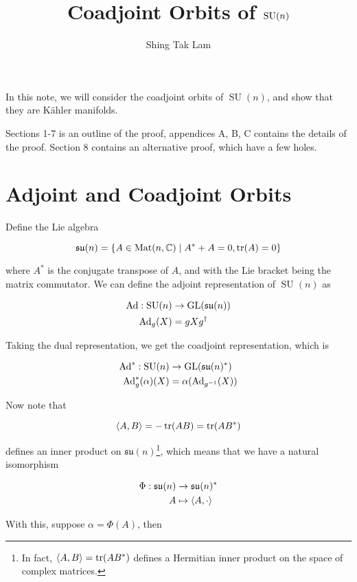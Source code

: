 \documentclass{article}
\title{Coadjoint Orbits of \(\SU(n)\)}
\author{Shing Tak Lam}
\DeclareMathOperator{\SU}{SU}
\newcommand{\su}{\mathfrak{su}}
\begin{document}
\maketitle

In this note, we will consider the coadjoint orbits of \(\SU(n)\), and show that they are K\"ahler manifolds.

Sections 1-7 is an outline of the proof, appendices A, B, C contains the details of the proof. Section 8 contains an alternative proof, which have a few holes.

\tableofcontents

\section{Adjoint and Coadjoint Orbits}

Define the Lie algebra

\[\su(n) = \left\{A \in \Mat(n, \C) \mid A^* + A = 0, \tr(A) = 0\right\}\]

where \(A^*\) is the conjugate transpose of \(A\), and with the Lie bracket being the matrix commutator. We can define the adjoint representation of \(\SU(n)\) as

\begin{align*}
    \Ad : \SU(n) &\to \GL(\su(n)) \\
    \Ad_g(X) &= gXg^\dagger
\end{align*}

Taking the dual representation, we get the coadjoint representation, which is

\begin{align*}
    \Ad^* : \SU(n) &\to \GL(\su(n)^*) \\
    \Ad^*_g(\alpha)(X) &= \alpha(\Ad_{g^{-1}}(X))
\end{align*}

Now note that

\[\left\langle A, B \right\rangle = -\tr(AB) = \tr(AB^*)\]

defines an inner product on \(\su(n)\)\footnote{In fact, \(\left\langle A, B \right\rangle = \tr(AB^*)\) defines a Hermitian inner product on the space of complex matrices.}, which means that we have a natural isomorphism

\begin{align*}
    \Phi : \su(n) &\to \su(n)^* \\
    A &\mapsto \inner{A, \cdot}
\end{align*}

With this, suppose \(\alpha = \Phi(A)\), then
\end{document}
